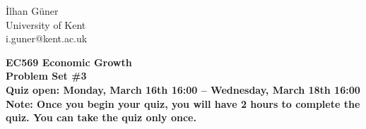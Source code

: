 \documentclass[11pt]{article}
\begin{document}





\noindent \.Ilhan G\"uner\\ University of Kent \\ i.guner@kent.ac.uk

\begin{center}
\textbf{EC569 Economic Growth \\ Problem Set \#3 } \\
\textbf{Quiz open: Monday, March 16th 16:00 -- Wednesday, March 18th 16:00} \\
\textbf{Note: Once you begin your quiz, you will have 2 hours to complete the quiz. You can take the quiz only once.}

\end{center}



\vspace{.3cm}
\end{document}
